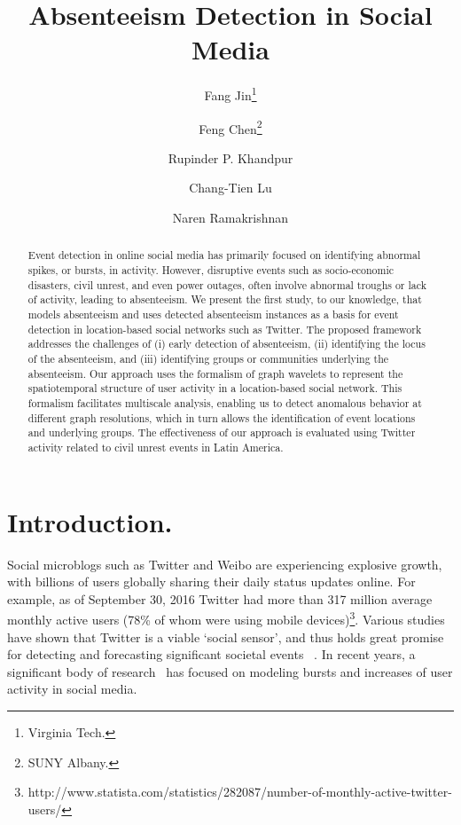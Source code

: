 \documentclass[twoside,leqno,twocolumn]{article}
\begin{document}


\title{Absenteeism Detection in Social Media}
\author{Fang Jin\thanks{Virginia Tech.}
\and
Feng Chen\thanks{SUNY Albany.}
\and
Rupinder P. Khandpur\footnotemark[1]
\and
Chang-Tien Lu\footnotemark[1]
\and
Naren Ramakrishnan\footnotemark[1]}
\date{}

\maketitle



\begin{abstract} \small\baselineskip=9pt Event detection in online social media has primarily focused on identifying abnormal spikes, or bursts, in activity. However, disruptive events such as socio-economic disasters, civil unrest, and even power outages, often involve abnormal troughs or lack of activity,
leading to absenteeism. We present the first study, to our knowledge, that models absenteeism and uses detected absenteeism instances as a basis for event detection in location-based social networks such as Twitter. The proposed framework addresses the challenges of (i) early detection of absenteeism, (ii) identifying the locus of the absenteeism, and (iii) identifying groups or communities underlying the absenteeism. Our approach uses the formalism of graph wavelets to represent the spatiotemporal structure of
user activity in a location-based social network. This formalism facilitates multiscale analysis, enabling us to detect anomalous behavior at different graph resolutions, which in turn allows the identification of event locations and underlying groups. The effectiveness of our approach is evaluated using Twitter activity related to civil unrest events in Latin America.\end{abstract}




\section{Introduction.}\label{sec:introduction}
Social microblogs such as Twitter and Weibo are experiencing explosive growth, with billions of users globally sharing their daily status updates online. For example, as of September 30, 2016 Twitter had more than 317 million average monthly active users (78\% of whom were using mobile devices)\footnote{http://www.statista.com/statistics/282087/number-of-monthly-active-twitter-users/}.
Various studies have shown that Twitter is a viable `social sensor', and thus holds great promise for detecting and forecasting significant societal events ~\cite{sakaki2010earthquake}.
In recent years, a significant body of research~\cite{aggarwal2012event,hong2012discovering,lappas2009burstiness,sakaki2010earthquake,sayyadi2009event,weng2011event,yin2011geographical} has focused on modeling bursts and increases of user activity in social media.
\end{document}

